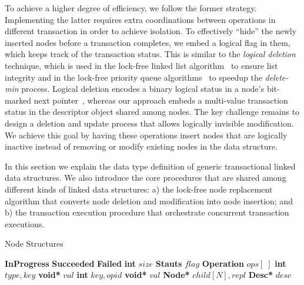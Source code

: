 \documentclass[10pt,conference,compsocconf]{IEEEtran}
\begin{document}
To achieve a higher degree of efficiency, we follow the former strategy.
Implementing the latter requires extra coordinations between operations in different transaction in order to achieve isolation.
To effectively ``hide'' the newly inserted nodes before a transaction completes, we embed a logical flag in them, which keeps track of the transaction status. 
This is similar to the \emph{logical deletion} technique, which is used in the lock-free linked list algorithm~\cite{harris2001pragmatic} to ensure list integrity and in the lock-free priority queue algorithms~\cite{linden2013skiplist,zhang2015lockfree} to speedup the \emph{delete-min} process.
Logical deletion encodes a binary logical status in a node's bit-marked next pointer~\cite{harris2001pragmatic}, whereas our approach embeds a multi-value transaction status in the descriptor object shared among nodes.
The key challenge remains to design a deletion and update process that allows logically invisible modification.
We achieve this goal by having these operations insert nodes that are logically inactive instead of removing or modify existing nodes in the data structure.

In this section we explain the data type definition of generic transactional linked data structures. 
We also introduce the core procedures that are shared among different kinds of linked data structures: a) the lock-free node replacement algorithm that converts node deletion and modification into node insertion; and b) the transaction execution procedure that orchestrate concurrent transaction executions.

\begin{algorithm}[h]
    \caption{Node Structures}
    \label{alg:nodestructure}
    \vspace{-0.2in}
    \begin{multicols}{2}
        \begin{algorithmic}[1]
            \State \textbf{InProgress}
            \State \textbf{Succeeded}
            \State \textbf{Failed}
            \EndEnum
            \State \textbf{int} $size$
            \State \textbf{Stauts} $flag$
            \State \textbf{Operation} $ops[\;]$
            \EndStruct
            \State \textbf{int} $type,key$
            \State \textbf{void*} $val$
            \EndStruct
            \State \textbf{int} $key,opid$
            \State \textbf{void*} $val$
            \State \textbf{Node*} $child[N],repl$
            \State \textbf{Desc*} $desc$
            \EndStruct
            \end{algorithmic}
    \end{multicols}
    \vspace{-0.15in}
\end{algorithm}
\end{document}
